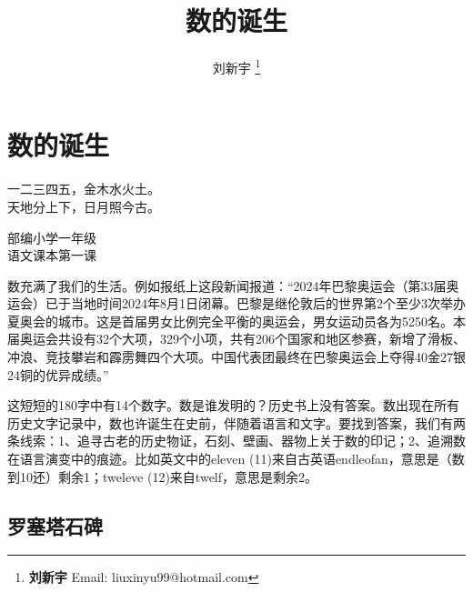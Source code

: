 \documentclass[b5paper]{ctexart}
\begin{document}
\title{数的诞生}

\author{刘新宇
\thanks{{\bfseries 刘新宇} \newline
  Email: liuxinyu99@hotmail.com \newline}
  }

\maketitle
\fi


\ifx\wholebook\relax
\chapter{数的诞生}
\fi

\epigraph{一二三四五，金木水火土。\\
天地分上下，日月照今古。}{部编小学一年级\\
语文课本第一课}

数充满了我们的生活。例如报纸上这段新闻报道：“2024年巴黎奥运会（第33届奥运会）已于当地时间2024年8月1日闭幕。巴黎是继伦敦后的世界第2个至少3次举办夏奥会的城市。这是首届男女比例完全平衡的奥运会，男女运动员各为5250名。本届奥运会共设有32个大项，329个小项，共有206个国家和地区参赛，新增了滑板、冲浪、竞技攀岩和霹雳舞四个大项。中国代表团最终在巴黎奥运会上夺得40金27银24铜的优异成绩。”

这短短的180字中有14个数字。数是谁发明的？历史书上没有答案。数出现在所有历史文字记录中，数也许诞生在史前，伴随着语言和文字。要找到答案，我们有两条线索：1、追寻古老的历史物证，石刻、壁画、器物上关于数的印记；2、追溯数在语言演变中的痕迹。比如英文中的eleven (11)来自古英语endleofan，意思是（数到10还）剩余1；tweleve (12)来自twelf，意思是剩余2。

\section{罗塞塔石碑}
\end{document}
